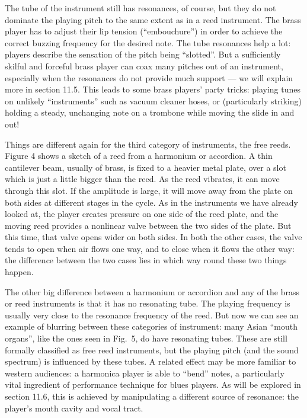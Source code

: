   The tube of the instrument still has resonances, of course, but they do not 
  dominate the playing pitch to the same extent as in a reed instrument. The 
  brass player has to adjust their lip tension (“embouchure”) in order to 
  achieve the correct buzzing frequency for the desired note. The tube 
  resonances help a lot: players describe the sensation of the pitch being 
  “slotted”. But a sufficiently skilful and forceful brass player can coax many 
  pitches out of an instrument, especially when the resonances do not provide 
  much support — we will explain more in section 11.5. This leads to some brass 
  players’ party tricks: playing tunes on unlikely “instruments” such as vacuum 
  cleaner hoses, or (particularly striking) holding a steady, unchanging note 
  on a trombone while moving the slide in and out! 

  Things are different again for the third category of instruments, the free 
  reeds. Figure 4 shows a sketch of a reed from a harmonium or accordion. A 
  thin cantilever beam, usually of brass, is fixed to a heavier metal plate, 
  over a slot which is just a little bigger than the reed. As the reed 
  vibrates, it can move through this slot. If the amplitude is large, it will 
  move away from the plate on both sides at different stages in the cycle. As 
  in the instruments we have already looked at, the player creates pressure on 
  one side of the reed plate, and the moving reed provides a nonlinear valve 
  between the two sides of the plate. But this time, that valve opens wider on 
  both sides. In both the other cases, the valve tends to open when air flows 
  one way, and to close when it flows the other way: the difference between the 
  two cases lies in which way round these two things happen. 

  The other big difference between a harmonium or accordion and any of the 
  brass or reed instruments is that it has no resonating tube. The playing 
  frequency is usually very close to the resonance frequency of the reed. But 
  now we can see an example of blurring between these categories of instrument: 
  many Asian “mouth organs”, like the ones seen in Fig.\ 5, do have resonating 
  tubes. These are still formally classified as free reed instruments, but the 
  playing pitch (and the sound spectrum) is influenced by these tubes. A 
  related effect may be more familiar to western audiences: a harmonica player 
  is able to “bend” notes, a particularly vital ingredient of performance 
  technique for blues players. As will be explored in section 11.6, this is 
  achieved by manipulating a different source of resonance: the player’s mouth 
  cavity and vocal tract. 

